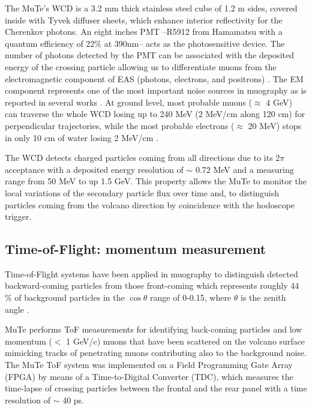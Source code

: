 \documentclass[letterpaper,11pt]{article}
\begin{document}

The MuTe's WCD is a 3.2 mm thick stainless steel cube of 1.2 m sides, covered inside with Tyvek diffuser sheets, which enhance interior reflectivity for the Cherenkov photons. An eight inches PMT --R5912 from Hamamatsu with a quantum efficiency of 22$\%$ at 390nm-- acts as the photosensitive device. The number of photons detected by the PMT can be associated with the deposited energy of the crossing particle allowing us to differentiate muons from the electromagnetic component of EAS (photons, electrons, and positrons) \cite{Billoir2014}. The EM component represents one of the most important noise sources in muography as is reported in several works \cite{KUSAGAYA2015, Nishiyama2014Noise, Marteau2012Noise}. At ground level, most probable muons ($\approx$ 4 GeV) can traverse the whole WCD losing up to 240 MeV (2 MeV/cm along 120 cm) for perpendicular trajectories, while the most probable electrons ($\approx$ 20 MeV) stops in only 10 cm of water losing 2 MeV/cm  \cite{groom2001muon,groom2000passage,lohmann1985energy,olive2014passage,Vasquez2018, Motta2018}.

The WCD detects charged particles coming from all directions due to its 2$\pi$ acceptance with a deposited energy resolution of $\sim$ 0.72 MeV and a measuring range from 50 MeV to up 1.5 GeV. This property allows the MuTe to monitor the local variations of the secondary particle flux over time and, to distinguish particles coming from the volcano direction by coincidence with the hodoscope trigger. 

\subsection{Time-of-Flight: momentum measurement}

Time-of-Flight systems have been applied in muography to distinguish detected backward-coming particles from those front-coming \cite{jourde2013experimental} which represents roughly 44 $\%$ of background particles in the $\cos \theta$ range of 0-0.15, where $\theta$ is the zenith angle \cite{nishiyama2016monte}.

MuTe performs ToF measurements for identifying back-coming particles and low momentum ($<$ 1 GeV/c) muons that have been scattered on the volcano surface mimicking tracks of penetrating muons contributing also to the background noise. The MuTe ToF system was implemented on a Field Programming Gate Array (FPGA) by means of a Time-to-Digital Converter (TDC), which measures the time-lapse of crossing particles between the frontal and the rear panel with a time resolution of $\sim$ 40 ps. 
\end{document}
